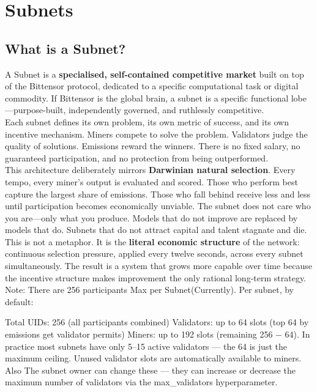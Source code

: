 \documentclass[12pt, a4paper, oneside]{report}
\theoremstyle{definition}
\begin{document}
\section{Subnets}
\label{chap:subnets}

\subsection{What is a Subnet?}

A Subnet is a \textbf{specialised, self-contained competitive market} built on 
top of the Bittensor protocol, dedicated to a specific computational task or 
digital commodity. If Bittensor is the global brain, a subnet is a specific 
functional lobe—purpose-built, independently governed, and ruthlessly competitive.\\[0.4cm]

Each subnet defines its own problem, its own metric of success, and its own 
incentive mechanism. Miners compete to solve the problem. Validators judge the 
quality of solutions. Emissions reward the winners. There is no fixed salary, 
no guaranteed participation, and no protection from being outperformed.\\[0.4cm]

This architecture deliberately mirrors \textbf{Darwinian natural selection}. 
Every tempo, every miner's output is evaluated and scored. Those who perform 
best capture the largest share of emissions. Those who fall behind receive less 
and less until participation becomes economically unviable. The subnet does not care 
who you are—only what you produce. Models that do not improve are replaced by 
models that do. Subnets that do not attract capital and talent stagnate and 
die.\\[0.4cm]

This is not a metaphor. It is the \textbf{literal economic structure} of the 
network: continuous selection pressure, applied every twelve seconds, across 
every subnet simultaneously. The result is a system that grows more capable 
over time because the incentive structure 
makes improvement the only rational long-term strategy.\\[0.4cm]

Note: There are 256 participants Max per Subnet(Currently).
Per subnet, by default:

Total UIDs: 256 (all participants combined)
Validators: up to 64 slots (top 64 by emissions get validator permits)
Miners: up to 192 slots (remaining 256 − 64). In practice most subnets have only 5–15 active validators — the 64 is just the maximum ceiling. Unused validator slots are automatically available to miners.
Also The subnet owner can change these — they can increase or decrease the maximum number of validators via the max\_validators hyperparameter.
\end{document}
